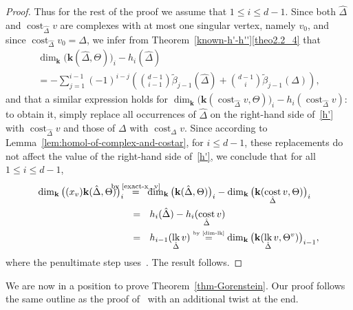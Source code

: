 \documentclass[ALCO,ThmDefs,Unicode,epreuves]{cedram}
\DeclareMathOperator\lk{lk}
\DeclareMathOperator\cost{cost}
\newcommand{\complet}[1]{\hat{#1}}
\newcommand{\field}{\mathbf{k}}
\begin{document}
\begin{proof}
Thus for the rest of the proof we assume that $1\leq i\leq d-1$. Since both $\complet{\Delta}$ and $\cost_{\complet{\Delta}}v$ are complexes with at most one singular vertex, namely $v_0$, and since $\cost_{\complet{\Delta}}v_0=\Delta$, we infer from Theorem~\ref{known-h'-h''}\eqref{theo2.2_4} that
\begin{multline} \label{h'}
\dim_\field \big(\field(\complet{\Delta},\Theta)\big)_i-h_i(\complet{\Delta}) \\
=
-\sum_{j=1}^{i-1}(-1)^{i-j}\left(\binom{d-1}{i-1}\tilde{\beta}_{j-1}(\complet{\Delta})+\binom{d-1}{i}\tilde{\beta}_{j-1}(\Delta)\right),
\end{multline}
and that a similar expression holds for $\dim_\field\big(\field(\cost_{\complet{\Delta}}v,\Theta)\big)_i-h_i(\cost_{\complet{\Delta}}v)$: to obtain it, simply replace all occurrences of $\complet{\Delta}$ on the right-hand side of~\eqref{h'} with $\cost_{\complet{\Delta}}v$ and those of $\Delta$ with $\cost_{\Delta}v$. Since according to Lemma~\ref{lem:homol-of-complex-and-costar}, for $i\leq d-1$, these replacements do not affect the value of the right-hand side of~\eqref{h'}, we conclude that for all $1\leq i\leq d-1$,
\begin{align*}
\dim_\field \big((x_v)\field(\complet{\Delta},\Theta)\big)_i & 
\ \ \mathop{=}^{\hbox to 0pt {\hss\text{\scriptsize by~\eqref{exact-x_v}}\hss}} \ \ 
\dim_\field\big(\field(\complet{\Delta},\Theta)\big)_i- \dim_\field\big(\field(\cost_{\complet{\Delta}}v,\Theta)\big)_i 
\\
&\ \ = \ \ h_i(\complet{\Delta})-h_i(\cost_{\complet{\Delta}}v) \\
&\ \ = \ \ h_{i-1}(\lk_{\complet{\Delta}}v) \stackrel{\mbox{\tiny{by~\eqref{dim-lk}}}}{=}
\dim_\field \big(\field(\lk_{\complet{\Delta}}v, \Theta^v)\big)_{i-1}, 
\end{align*}
where the penultimate step uses~\cite[Lemma~4.1]{Athanasiadis-11}. The result follows.
\end{proof}

We are now in a position to prove Theorem~\ref{thm-Gorenstein}. Our proof follows the same outline as the proof of~\cite[Theorem~1.4]{Novik-Swartz-09:Gorenstein} with an additional twist at the end.
\end{document}
